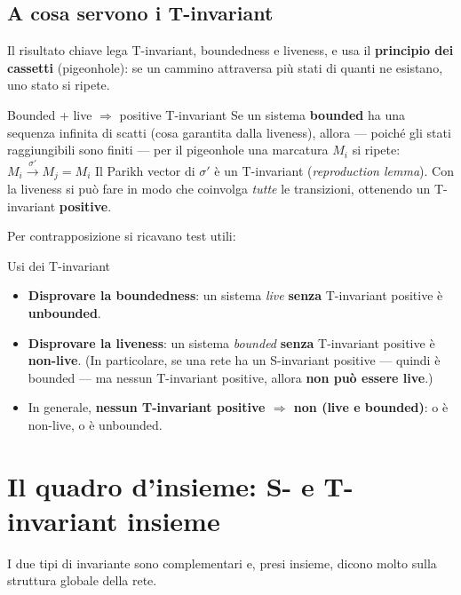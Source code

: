 \subsection{\texorpdfstring{A cosa servono i T-invariant}{A cosa servono i T-invariant}}

Il risultato chiave lega T-invariant, boundedness e liveness, e usa il \textbf{principio dei cassetti} (pigeonhole): se un cammino attraversa più stati di quanti ne esistano, uno stato si ripete.

\begin{boxtheorem}{Bounded + live $\Longrightarrow$ positive T-invariant}
Se un sistema \textbf{bounded} ha una sequenza infinita di scatti (cosa garantita dalla liveness), allora — poiché gli stati raggiungibili sono finiti — per il pigeonhole una marcatura $M_i$ si ripete: \(M_i \xrightarrow{\sigma'} M_j = M_i\) Il Parikh vector di $\sigma'$ è un T-invariant (\emph{reproduction lemma}). Con la liveness si può fare in modo che coinvolga \emph{tutte} le transizioni, ottenendo un T-invariant \textbf{positive}.
\end{boxtheorem}

Per contrapposizione si ricavano test utili:

\begin{boxnote}{Usi dei T-invariant}
\begin{itemize}
\item \textbf{Disprovare la boundedness}: un sistema \emph{live} \textbf{senza} T-invariant positive è \textbf{unbounded}.
\item \textbf{Disprovare la liveness}: un sistema \emph{bounded} \textbf{senza} T-invariant positive è \textbf{non-live}. (In particolare, se una rete ha un S-invariant positive — quindi è bounded — ma nessun T-invariant positive, allora \textbf{non può essere live}.)
\item In generale, \textbf{nessun T-invariant positive $\Longrightarrow$ non (live e bounded)}: o è non-live, o è unbounded.
\end{itemize}
\end{boxnote}

\section{\texorpdfstring{Il quadro d'insieme: S- e T-invariant insieme}{Il quadro d'insieme: S- e T-invariant insieme}}

I due tipi di invariante sono complementari e, presi insieme, dicono molto sulla struttura globale della rete.

